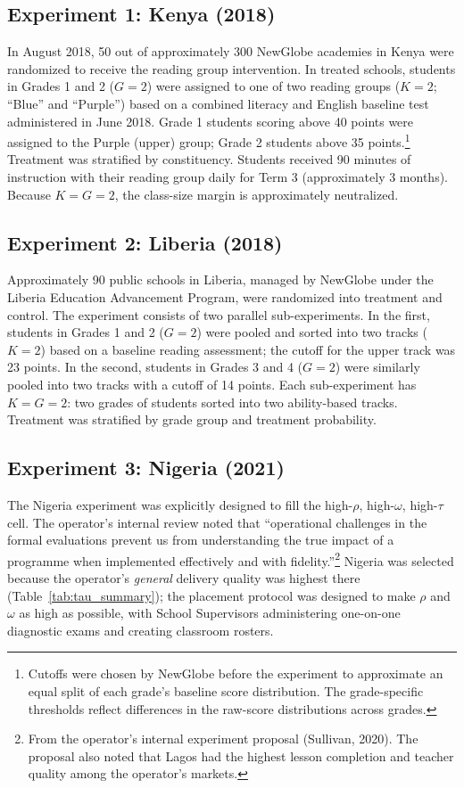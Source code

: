 \documentclass[11pt]{article}
\begin{document}
\subsection{Experiment 1: Kenya (2018)}

In August 2018, 50 out of approximately 300 NewGlobe academies in Kenya were randomized to receive the reading group intervention. In treated schools, students in Grades 1 and 2 ($G = 2$) were assigned to one of two reading groups ($K = 2$; ``Blue'' and ``Purple'') based on a combined literacy and English baseline test administered in June 2018. Grade 1 students scoring above 40 points were assigned to the Purple (upper) group; Grade 2 students above 35 points.\footnote{Cutoffs were chosen by NewGlobe before the experiment to approximate an equal split of each grade's baseline score distribution. The grade-specific thresholds reflect differences in the raw-score distributions across grades.} Treatment was stratified by constituency. Students received 90 minutes of instruction with their reading group daily for Term 3 (approximately 3 months). Because $K = G = 2$, the class-size margin is approximately neutralized.

\subsection{Experiment 2: Liberia (2018)}

Approximately 90 public schools in Liberia, managed by NewGlobe under the Liberia Education Advancement Program, were randomized into treatment and control. The experiment consists of two parallel sub-experiments. In the first, students in Grades 1 and 2 ($G = 2$) were pooled and sorted into two tracks ($K = 2$) based on a baseline reading assessment; the cutoff for the upper track was 23 points. In the second, students in Grades 3 and 4 ($G = 2$) were similarly pooled into two tracks with a cutoff of 14 points. Each sub-experiment has $K = G = 2$: two grades of students sorted into two ability-based tracks. Treatment was stratified by grade group and treatment probability.

\subsection{Experiment 3: Nigeria (2021)}

The Nigeria experiment was explicitly designed to fill the high-$\rho$, high-$\omega$, high-$\tau$ cell. The operator's internal review noted that ``operational challenges in the formal evaluations prevent us from understanding the true impact of a programme when implemented effectively and with fidelity.''\footnote{From the operator's internal experiment proposal (Sullivan, 2020). The proposal also noted that Lagos had the highest lesson completion and teacher quality among the operator's markets.} Nigeria was selected because the operator's \emph{general} delivery quality was highest there (Table~\ref{tab:tau_summary}); the placement protocol was designed to make $\rho$ and $\omega$ as high as possible, with School Supervisors administering one-on-one diagnostic exams and creating classroom rosters.
\end{document}
